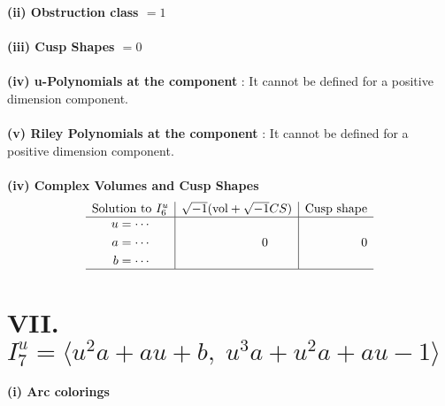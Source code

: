 \documentclass[1p]{elsarticle_modified}
\theoremstyle{definition}
\newcommand{\I}{\sqrt{-1}}
\begin{document}
\flushleft \textbf{(ii) Obstruction class $= 1$}\\~\\
\flushleft \textbf{(iii) Cusp Shapes $= 0$}\\~\\
\flushleft \textbf{(iv) u-Polynomials at the component} : It cannot be defined for a positive dimension component.\\~\\
\flushleft \textbf{(v) Riley Polynomials at the component} : It cannot be defined for a positive dimension component.\\~\\
\newpage\flushleft \textbf{(iv) Complex Volumes and Cusp Shapes}
$$\begin{array}{c|c|c} 
\text{Solution to }I^u_{6}& \I (\text{vol} + \sqrt{-1}CS) & \text{Cusp shape}\\
 \hline 
\begin{aligned}
u &= \cdots \\
a &= \cdots \\
b &= \cdots\end{aligned}
 & \phantom{-0.000000 } 0 & \phantom{-0.000000 } 0\\
 \hline 
 \end{array}
$$\newpage\renewcommand{\arraystretch}{1}
\centering \section*{VII. $I^u_{7}= \langle u^2 a+a u+b,\;u^3 a+u^2 a+a u-1 \rangle$}
\flushleft \textbf{(i) Arc colorings}\\
\end{document}
